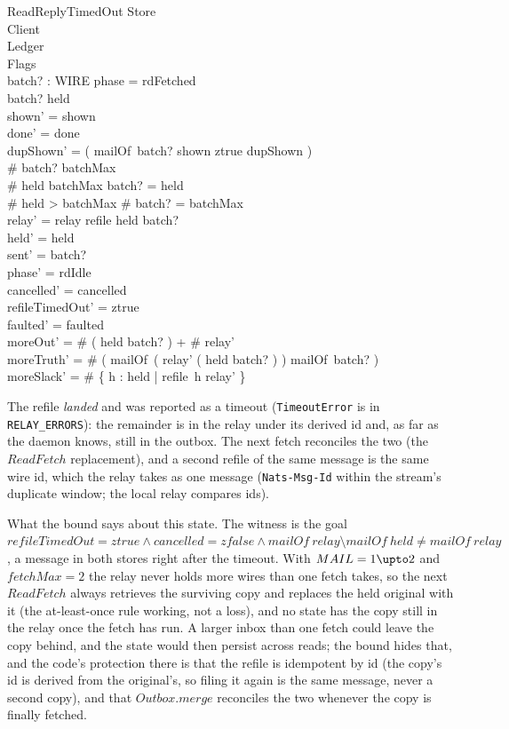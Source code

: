 \documentclass[a4paper,10pt,fleqn]{article}
\begin{document}
\begin{schema}{ReadReplyTimedOut}
  \Delta Store \\
  \Delta Client \\
  \Xi Ledger \\
  \Delta Flags \\
  batch? : \power WIRE
  \where
  phase = rdFetched \\
  batch? \subseteq held \\
  shown' = shown \\
  done' = done \\
  dupShown' = ( \IF mailOf~batch? \cap shown \neq \emptyset \THEN ztrue \ELSE dupShown ) \\
  \# batch? \leq batchMax \\
  \# held \leq batchMax \implies batch? = held \\
  \# held > batchMax \implies \# batch? = batchMax \\
  relay' = relay \cup refile \limg held \setminus batch? \rimg \\
  held' = held \\
  sent' = batch? \\
  phase' = rdIdle \\
  cancelled' = cancelled \\
  refileTimedOut' = ztrue \\
  faulted' = faulted \\
  moreOut' = \# ( held \setminus batch? ) + \# relay' \\
  moreTruth' = \# ( mailOf~( relay' \cup ( held \setminus batch? ) ) \setminus
    mailOf~batch? ) \\
  moreSlack' = \# \{ h : held | refile~h \in relay' \}
\end{schema}

The refile \emph{landed} and was reported as a timeout (\texttt{TimeoutError}
is in \texttt{RELAY\_ERRORS}): the remainder is in the relay under its derived
id and, as far as the daemon knows, still in the outbox.  The next fetch
reconciles the two (the $ReadFetch$ replacement), and a second refile of the
same message is the same wire id, which the relay takes as one message
(\texttt{Nats-Msg-Id} within the stream's duplicate window; the local relay
compares ids).

What the bound says about this state.  The witness is the goal
$refileTimedOut = ztrue \land cancelled = zfalse \land mailOf~relay \setminus mailOf~held \neq
mailOf~relay$, a message in both stores right after the timeout.  With
$MAIL = 1 \upto 2$ and $fetchMax = 2$ the relay never holds more wires than one
fetch takes, so the next $ReadFetch$ always retrieves the surviving copy and
replaces the held original with it (the at-least-once rule working, not a
loss), and no state has the copy still in the relay once the fetch has run.  A
larger inbox than one fetch could leave the copy behind, and the state would
then persist across reads; the bound hides that, and the code's protection
there is that the refile is idempotent by id (the copy's id is derived from the
original's, so filing it again is the same message, never a second copy), and
that $Outbox.merge$ reconciles the two whenever the copy is finally fetched.
\end{document}
